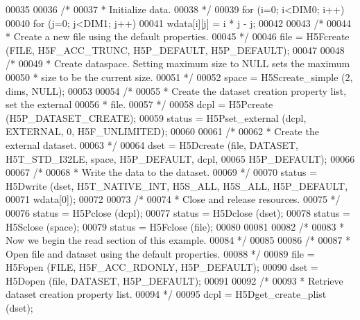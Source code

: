 \begin{DoxyCode}
00035 
00036     \textcolor{comment}{/*}
00037 \textcolor{comment}{     * Initialize data.}
00038 \textcolor{comment}{     */}
00039     \textcolor{keywordflow}{for} (i=0; i<DIM0; i++)
00040         \textcolor{keywordflow}{for} (j=0; j<DIM1; j++)
00041             wdata[i][j] = i * j - j;
00042 
00043     \textcolor{comment}{/*}
00044 \textcolor{comment}{     * Create a new file using the default properties.}
00045 \textcolor{comment}{     */}
00046     file = H5Fcreate (FILE, H5F\_ACC\_TRUNC, H5P\_DEFAULT, H5P\_DEFAULT);
00047 
00048     \textcolor{comment}{/*}
00049 \textcolor{comment}{     * Create dataspace.  Setting maximum size to NULL sets the maximum}
00050 \textcolor{comment}{     * size to be the current size.}
00051 \textcolor{comment}{     */}
00052     space = H5Screate\_simple (2, dims, NULL);
00053 
00054     \textcolor{comment}{/*}
00055 \textcolor{comment}{     * Create the dataset creation property list, set the external}
00056 \textcolor{comment}{     * file.}
00057 \textcolor{comment}{     */}
00058     dcpl = H5Pcreate (H5P\_DATASET\_CREATE);
00059     status = H5Pset\_external (dcpl, EXTERNAL, 0, H5F\_UNLIMITED);
00060 
00061     \textcolor{comment}{/*}
00062 \textcolor{comment}{     * Create the external dataset.}
00063 \textcolor{comment}{     */}
00064     dset = H5Dcreate (file, DATASET, H5T\_STD\_I32LE, space, H5P\_DEFAULT, dcpl,
00065                 H5P\_DEFAULT);
00066 
00067     \textcolor{comment}{/*}
00068 \textcolor{comment}{     * Write the data to the dataset.}
00069 \textcolor{comment}{     */}
00070     status = H5Dwrite (dset, H5T\_NATIVE\_INT, H5S\_ALL, H5S\_ALL, H5P\_DEFAULT,
00071                 wdata[0]);
00072 
00073     \textcolor{comment}{/*}
00074 \textcolor{comment}{     * Close and release resources.}
00075 \textcolor{comment}{     */}
00076     status = H5Pclose (dcpl);
00077     status = H5Dclose (dset);
00078     status = H5Sclose (space);
00079     status = H5Fclose (file);
00080 
00081 
00082     \textcolor{comment}{/*}
00083 \textcolor{comment}{     * Now we begin the read section of this example.}
00084 \textcolor{comment}{     */}
00085 
00086     \textcolor{comment}{/*}
00087 \textcolor{comment}{     * Open file and dataset using the default properties.}
00088 \textcolor{comment}{     */}
00089     file = H5Fopen (FILE, H5F\_ACC\_RDONLY, H5P\_DEFAULT);
00090     dset = H5Dopen (file, DATASET, H5P\_DEFAULT);
00091 
00092     \textcolor{comment}{/*}
00093 \textcolor{comment}{     * Retrieve dataset creation property list.}
00094 \textcolor{comment}{     */}
00095     dcpl = H5Dget\_create\_plist (dset);

\end{DoxyCode}
